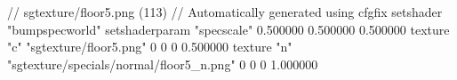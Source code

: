 // sgtexture/floor5.png (113)
// Automatically generated using cfgfix
setshader "bumpspecworld"
setshaderparam "specscale" 0.500000 0.500000 0.500000
texture "c" "sgtexture/floor5.png" 0 0 0 0.500000
texture "n" "sgtexture/specials/normal/floor5_n.png" 0 0 0 1.000000
